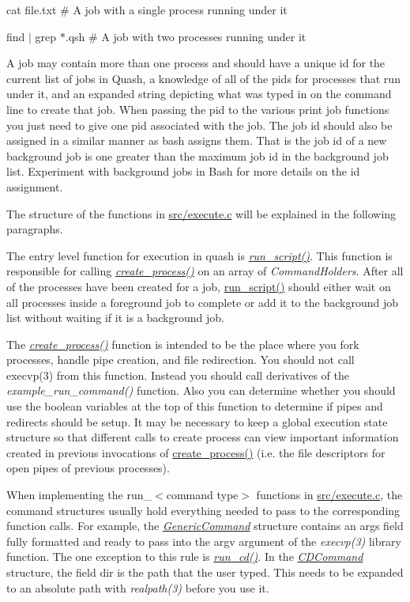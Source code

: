 cat file.\+txt \# A job with a single process running under it

find $\vert$ grep $\ast$.qsh \# A job with two processes running under it

A job may contain more than one process and should have a unique id for the current list of jobs in Quash, a knowledge of all of the pids for processes that run under it, and an expanded string depicting what was typed in on the command line to create that job. When passing the pid to the various print job functions you just need to give one pid associated with the job. The job id should also be assigned in a similar manner as bash assigns them. That is the job id of a new background job is one greater than the maximum job id in the background job list. Experiment with background jobs in Bash for more details on the id assignment.

The structure of the functions in \hyperlink{execute_8c}{src/execute.\+c} will be explained in the following paragraphs.

The entry level function for execution in quash is {\itshape \hyperlink{execute_8c_a4dab67459028f3b5a60d1a3695933f4b}{run\+\_\+script()}}. This function is responsible for calling {\itshape \hyperlink{execute_8c_acffe0d67f5dfe68ccf3765cf8ae29dab}{create\+\_\+process()}} on an array of {\itshape Command\+Holders}. After all of the processes have been created for a job, \hyperlink{execute_8c_a4dab67459028f3b5a60d1a3695933f4b}{run\+\_\+script()} should either wait on all processes inside a foreground job to complete or add it to the background job list without waiting if it is a background job.

The {\itshape \hyperlink{execute_8c_acffe0d67f5dfe68ccf3765cf8ae29dab}{create\+\_\+process()}} function is intended to be the place where you fork processes, handle pipe creation, and file redirection. You should not call execvp(3) from this function. Instead you should call derivatives of the {\itshape example\+\_\+run\+\_\+command()} function. Also you can determine whether you should use the boolean variables at the top of this function to determine if pipes and redirects should be setup. It may be necessary to keep a global execution state structure so that different calls to create process can view important information created in previous invocations of \hyperlink{execute_8c_acffe0d67f5dfe68ccf3765cf8ae29dab}{create\+\_\+process()} (i.\+e. the file descriptors for open pipes of previous processes).

When implementing the run\+\_\+$<$command type$>$ functions in \hyperlink{execute_8c}{src/execute.\+c}, the command structures usually hold everything needed to pass to the corresponding function calls. For example, the {\itshape \hyperlink{structGenericCommand}{Generic\+Command}} structure contains an args field fully formatted and ready to pass into the argv argument of the {\itshape execvp(3)} library function. The one exception to this rule is {\itshape \hyperlink{execute_8c_a8e9aed155e5ccf7e207a8f3ce4789d83}{run\+\_\+cd()}}. In the {\itshape \hyperlink{structCDCommand}{C\+D\+Command}} structure, the field dir is the path that the user typed. This needs to be expanded to an absolute path with {\itshape realpath(3)} before you use it.

